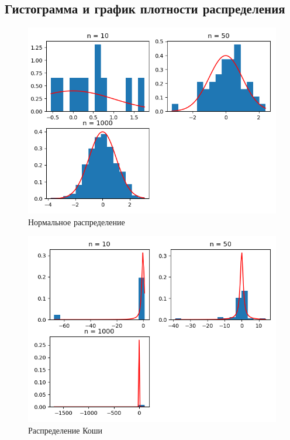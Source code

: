 \documentclass[a4]{article}
\begin{document}
		\subsection{Гистограмма и график плотности распределения}	
			\begin{center}
				
				\begin{figure}[h]
					\includegraphics[width=\textwidth]{normal1.png} 
					\caption[Нормальное распределение]{Нормальное распределение}
				\end{figure}
				\newpage
				\begin{figure}
					\includegraphics[width=\textwidth]{cauchy1.png}
					\caption[Распределение Коши]{Распределение Коши}

\end{figure}
\end{center}
\end{document}
